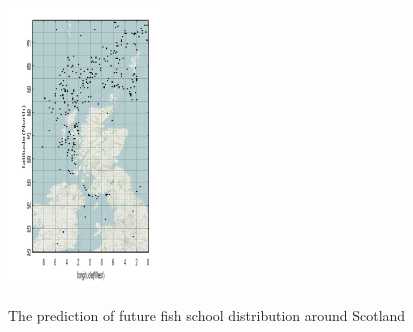 \documentclass{mcmthesis}
\numberwithin{figure}{section}
\numberwithin{table}{section}
\begin{document}
\begin{figure}[H]
{  \includegraphics[width=4.2cm]{./picture/1_12.png}}
  \hspace{0in}
  \hspace{0in}
  \label{Dist}
  \caption{The prediction of future fish school distribution around Scotland}
  \end{figure}
\end{document}
